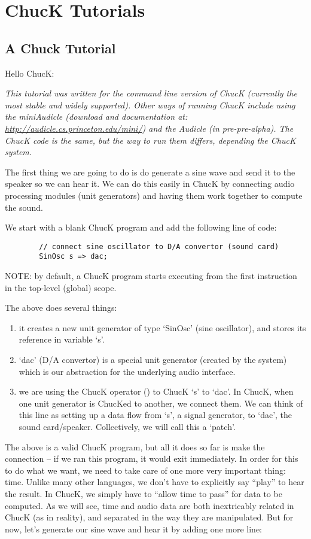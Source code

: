 \chapter{ChucK Tutorials}

\section{A Chuck Tutorial}
Hello ChucK: 

\textit{This tutorial was written for the command line version of ChucK (currently the most stable and widely supported).  Other ways of running ChucK include using the miniAudicle (download and documentation at: \href{http://audicle.cs.princeton.edu/mini/}{http://audicle.cs.princeton.edu/mini/}) and the Audicle (in pre-pre-alpha).  The ChucK code is the same, but the way to run them differs, depending the ChucK system.}

The first thing we are going to do is do generate a sine wave and send it to the speaker so we can hear it. We can do this easily in ChucK by connecting audio processing modules (unit generators) and having them work together to compute the sound. 

We start with a blank ChucK program and add the following line of code:
\begin{verbatim}
        // connect sine oscillator to D/A convertor (sound card)
        SinOsc s => dac;
\end{verbatim}

NOTE: by default, a ChucK program starts executing from the first instruction in the top-level (global) scope.

The above does several things:
\begin{enumerate}
\item it creates a new unit generator of type `SinOsc' (sine oscillator), and stores its reference in variable `s'.
\item `dac' (D/A convertor) is a special unit generator (created by the system) which is our abstraction for the underlying audio interface.
\item we are using the ChucK operator (\chuckop) to ChucK `s' to `dac'. In ChucK, when one unit generator is ChucKed to another, we connect them. We can think of this line as setting up a data flow from `s', a signal generator, to `dac', the sound card/speaker. Collectively, we will call this a `patch'. 
\end{enumerate}

The above is a valid ChucK program, but all it does so far is make the connection -- if we ran this program, it would exit immediately. In order for this to do what we want, we need to take care of one more very important thing: time. Unlike many other languages, we don't have to explicitly say ``play'' to hear the result. In ChucK, we simply have to ``allow time to pass'' for data to be computed. As we will see, time and audio data are both inextricably related in ChucK (as in reality), and separated in the way they are manipulated. But for now, let's generate our sine wave and hear it by adding one more line:

